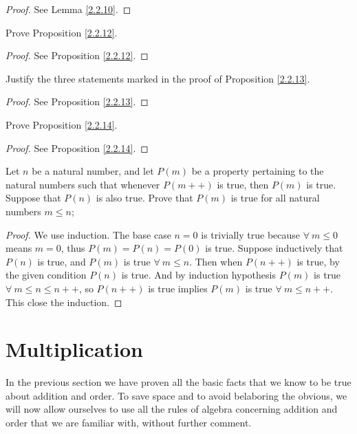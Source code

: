 \begin{proof}
See Lemma \ref{2.2.10}.
\end{proof}

\begin{exercise}\label{ex 2.2.3}
Prove Proposition \ref{2.2.12}.
\end{exercise}

\begin{proof}
See Proposition \ref{2.2.12}.
\end{proof}

\begin{exercise}\label{ex 2.2.4}
Justify the three statements marked in the proof of Proposition \ref{2.2.13}.
\end{exercise}

\begin{proof}
See Proposition \ref{2.2.13}.
\end{proof}

\begin{exercise}\label{ex 2.2.5}
Prove Proposition \ref{2.2.14}.
\end{exercise}

\begin{proof}
See Proposition \ref{2.2.14}.
\end{proof}

\begin{exercise}\label{ex 2.2.6}
Let \(n\) be a natural number, and let \(P(m)\) be a property pertaining to the natural numbers such that whenever \(P(m++)\) is true, then \(P(m)\) is true.
Suppose that \(P(n)\) is also true.
Prove that \(P(m)\) is true for all natural numbers \(m \leq n\);
\end{exercise}

\begin{proof}
We use induction.
The base case \(n = 0\) is trivially true because \(\forall\ m \leq 0\) means \(m = 0\), thus \(P(m) = P(n) = P(0)\) is true.
Suppose inductively that \(P(n)\) is true, and \(P(m)\) is true \(\forall\ m \leq n\).
Then when \(P(n++)\) is true, by the given condition \(P(n)\) is true.
And by induction hypothesis \(P(m)\) is true \(\forall\ m \leq n \leq n++\), so \(P(n++)\) is true implies \(P(m)\) is true \(\forall\ m \leq n++\).
This close the induction.
\end{proof}

\section{Multiplication}
In the previous section we have proven all the basic facts that we know to be true about addition and order.
To save space and to avoid belaboring the obvious, we will now allow ourselves to use all the rules of algebra concerning addition and order that we are familiar with, without further comment.

